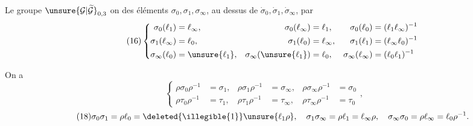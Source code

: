  Le groupe $\unsure{\mathcal G|\widetilde{\mathcal G}}_{0,3}$ on  des éléments
$\sigma_0,\sigma_1,\sigma_\infty$, au dessus de $\dot\sigma_0,\dot\sigma_1,\dot\sigma_\infty$, par
\[
\tag{16}
\left\{\begin{aligned}
\sigma_0(\ell_1)&=\ell_\infty,& \sigma_0(\ell_\infty)&=\ell_1,& \sigma_0(\ell_0)&=(\ell_1\ell_\infty)^{-1}\\
\sigma_1(\ell_\infty)&=\ell_0,& \sigma_1(\ell_0)&=\ell_\infty,& \sigma_1(\ell_1)&=(\ell_\infty\ell_0)^{-1}\\
\sigma_\infty(\ell_0)&=\unsure{\ell_1},& \sigma_\infty(\unsure{\ell_1})&=\ell_0,& \sigma_\infty(\ell_\infty)&=(\ell_0\ell_1)^{-1}
\end{aligned}\right.
\]

On a
\[
\tag{17}
\left\{\begin{aligned}
\rho\sigma_0\rho^{-1}&=\sigma_1,& \rho\sigma_1\rho^{-1}&=\sigma_\infty,& \rho\sigma_\infty\rho^{-1}&=\sigma_0\\
\rho\tau_0\rho^{-1}&=\tau_1,& \rho\tau_1\rho^{-1}&=\tau_\infty,& \rho\tau_\infty\rho^{-1}&=\tau_0
\end{aligned}\right.,
\]
\[
\tag{18}
\sigma_0\sigma_1=\rho\ell_0=\deleted{\illegible{1}}\unsure{\ell_1\rho},\quad
\sigma_1\sigma_\infty=\rho\ell_1=\ell_\infty\rho,\quad
\sigma_\infty\sigma_0=\rho\ell_\infty=\ell_0\rho^{-1}.
\]


